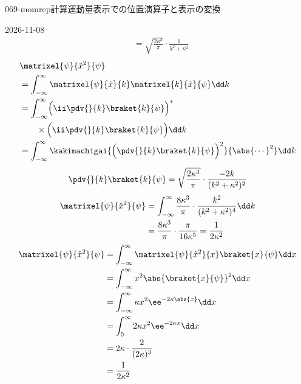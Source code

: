 \documentclass[uplatex,dvipdfmx,a4paper,11pt]{jsarticle}
\begin{document}
\begin{mondai}{069-momrep}{計算}{運動量表示での位置演算子と表示の変換}
\begin{kotaeutsushi}{2026-11-08}
\begin{align*}
&=\sqrt{\frac{2\kappa^{3}}{\pi}}\cdot\frac{1}{k^{2}+\kappa^{2}}
\end{align*}
\begin{align*}
&\matrixel{\psi}{\hat{x}^{2}}{\psi}\\
&=\int_{-\infty}^{\infty}\matrixel{\psi}{\hat{x}}{k}\matrixel{k}{\hat{x}}{\psi}\dd k\\
&=\int_{-\infty}^{\infty}\Bigl(\ii\pdv{}{k}\braket{k}{\psi}\Bigr)^{*}\\
&\qquad\times\Bigl(\ii\pdv{}{k}\braket{k}{\psi}\Bigr)\dd k\\
&=\int_{-\infty}^{\infty}\kakimachigai{\Bigl(\pdv{}{k}\braket{k}{\psi}\Bigr)^{2}}{\abs{\cdots}^{2}}\dd k
\end{align*}
\[ \pdv{}{k}\braket{k}{\psi}=\sqrt{\frac{2\kappa^{3}}{\pi}}\cdot\frac{-2k}{(k^{2}+\kappa^{2})^{2}} \]
\begin{align*}
\matrixel{\psi}{\hat{x}^{2}}{\psi}&=\int_{-\infty}^{\infty}\frac{8\kappa^{3}}{\pi}\cdot\frac{k^{2}}{(k^{2}+\kappa^{2})^{4}}\dd k\\
&=\frac{8\kappa^{3}}{\pi}\cdot\frac{\pi}{16\kappa^{5}}=\frac{1}{2\kappa^{2}}
\end{align*}
\begin{align*}
\matrixel{\psi}{\hat{x}^{2}}{\psi}&=\int_{-\infty}^{\infty}\matrixel{\psi}{\hat{x}^{2}}{x}\braket{x}{\psi}\dd x\\
&=\int_{-\infty}^{\infty}x^{2}\abs{\braket{x}{\psi}}^{2}\dd x\\
&=\int_{-\infty}^{\infty}\kappa x^{2}\ee^{-2\kappa\abs{x}}\dd x\\
&=\int_{0}^{\infty}2\kappa x^{2}\ee^{-2\kappa x}\dd x\\
&=2\kappa\cdot\frac{2}{(2\kappa)^{3}}\\
&=\frac{1}{2\kappa^{2}}
\end{align*}
\end{kotaeutsushi}
\end{mondai}
\end{document}
